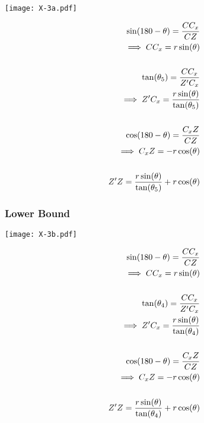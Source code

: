 \begin{minipage}[t]{0.5\textwidth}
\texttt{[image: X-3a.pdf]} 
\end{minipage}
\begin{minipage}[t]{0.5\textwidth}
\vspace{-2in}
\begin{equation*}
\centering
\begin{aligned}
\sin(180-\theta) = \frac{CC_x}{CZ}\\
\implies CC_x = r\sin(\theta) \\ \\
\tan(\theta_5) = \frac{CC_x}{Z'C_x}\\
\implies Z'C_x = \frac{r\sin(\theta)}{\tan(\theta_5)}\\\\
\cos(180-\theta) = \frac{C_{x}Z}{CZ}\\
\implies C_{x}Z = -r\cos(\theta)\\ \\
Z'Z = \frac{r\sin(\theta)}{\tan(\theta_5)} + r\cos(\theta)
\end{aligned}
\end{equation*}
\end{minipage}




\subsubsection{Lower Bound}

\begin{minipage}[t]{0.5\textwidth}
\texttt{[image: X-3b.pdf]} 
\end{minipage}
\begin{minipage}[t]{0.5\textwidth}
\vspace{-2in}
\begin{equation*}
\centering
\begin{aligned}
\sin(180-\theta) = \frac{CC_x}{CZ}\\
\implies CC_x = r\sin(\theta) \\ \\
\tan(\theta_4) = \frac{CC_x}{Z'C_x}\\
\implies Z'C_x = \frac{r\sin(\theta)}{\tan(\theta_4)}\\\\
\cos(180-\theta) = \frac{C_{x}Z}{CZ}\\
\implies C_{x}Z = -r\cos(\theta)\\ \\
Z'Z = \frac{r\sin(\theta)}{\tan(\theta_4)} + r\cos(\theta)
\end{aligned}
\end{equation*}
\end{minipage}

